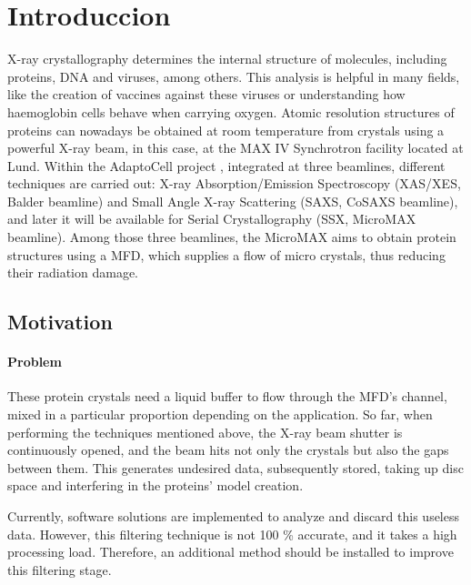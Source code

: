 \documentclass[../main.tex]{subfiles}%
\begin{document}
\chapter{Introduccion} %
\label{chap:introduccion} %


X-ray crystallography determines the internal structure of molecules, including proteins, DNA and viruses, among others. This analysis is helpful in many fields, like the creation of vaccines against these viruses or understanding how haemoglobin cells behave when carrying oxygen.
Atomic resolution structures of proteins can nowadays be obtained at room temperature from crystals using a powerful X-ray beam, in this case, at the MAX IV Synchrotron facility located at Lund. Within the AdaptoCell project \cite{max4web}, integrated at three beamlines, different techniques are carried out: X-ray Absorption/Emission Spectroscopy (XAS/XES, Balder beamline) and Small Angle X-ray Scattering (SAXS, CoSAXS beamline), and later it will be available for Serial Crystallography (SSX, MicroMAX beamline). Among those three beamlines, the MicroMAX aims to obtain protein structures using a \ac{MFD}, which supplies a flow of micro crystals, thus reducing their radiation damage.

\section{Motivation}
\subsubsection*{Problem}
These protein crystals need a liquid \cite{max4web} buffer to flow through the \ac{MFD}'s channel, mixed in a particular proportion depending on the application. So far, when performing the techniques mentioned above, the X-ray beam shutter is continuously opened, and the beam hits not only the crystals but also the gaps between them. This generates undesired data, subsequently stored, taking up disc space and interfering in the proteins' model creation.

Currently, software solutions are implemented to analyze and discard this useless data. However, this filtering technique is not 100 \% accurate, and it takes a high processing load. Therefore, an additional method should be installed to improve this filtering stage.
\end{document}
